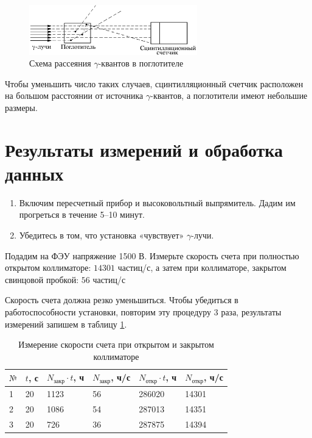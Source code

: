\documentclass[a4paper,12pt]{article}
\begin{document}
\begin{figure}[h]
    \begin{center}
        \includegraphics[width = 0.65\textwidth]{pictures/distortion.png}
        \caption{Схема рассеяния $\gamma$-квантов в поглотителе}
    \label{pic:distortion}
    \end{center}
\end{figure}

Чтобы уменьшить число таких случаев, сцинтилляционный счетчик расположен на большом расстоянии от источника $\gamma$-квантов, а поглотители имеют небольшие размеры.

\section{Результаты измерений и обработка данных}

\begin{enumerate}
    \item Включим пересчетный прибор и высоковольтный выпрямитель. Дадим им прогреться в течение 5–10 минут.
    \item Убедитесь в том, что установка «чувствует» $\gamma$-лучи.
\end{enumerate}

Подадим на ФЭУ напряжение 1500 В. Измерьте скорость счета при полностью открытом коллиматоре: $14301$ частиц/с, а затем при коллиматоре, закрытом свинцовой пробкой: $56$ частиц/с

Скорость счета должна резко уменьшиться. Чтобы убедиться в работоспособности установки, повторим эту процедуру 3 раза, результаты измерений запишем в таблицу \ref{table:1}.

\FloatBarrier
\begin{table}[!ht]
    \centering
    \begin{tabular}{|l|l|l|l|l|l|}
        \hline
        $№$ & $t$, с  & $N_\text{закр} \cdot t$, ч & $N_\text{закр}$, ч/с & $N_\text{откр} \cdot t$, ч & $N_\text{откр}$, ч/с \\ \hline
        1      & 20 & 1123   & 56            & 286020 & 14301       \\ \hline
        2      & 20 & 1086   & 54            & 287013 & 14351       \\ \hline
        3      & 20 & 726    & 36            & 287875 & 14394       \\ \hline
    \end{tabular}
    \caption{Измерение скорости счета при открытом и закрытом коллиматоре}
    \label{table:1}
\end{table}
\FloatBarrier
\end{document}
